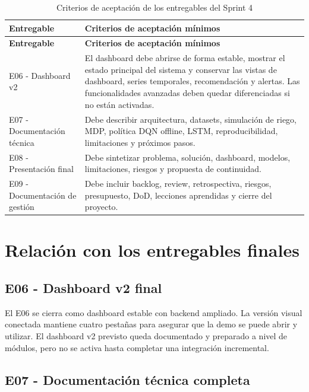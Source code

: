 \documentclass[11pt,a4paper]{article}
\begin{document}
\begin{longtable}{p{}p{}}
\caption{Criterios de aceptación de los entregables del Sprint 4}\\
\toprule
\textbf{Entregable} & \textbf{Criterios de aceptación mínimos} \\
\midrule
\endfirsthead
\toprule
\textbf{Entregable} & \textbf{Criterios de aceptación mínimos} \\
\midrule
\endhead
E06 - Dashboard v2 & El dashboard debe abrirse de forma estable, mostrar el estado principal del sistema y conservar las vistas de dashboard, series temporales, recomendación y alertas. Las funcionalidades avanzadas deben quedar diferenciadas si no están activadas. \\
E07 - Documentación técnica & Debe describir arquitectura, datasets, simulación de riego, MDP, política DQN offline, LSTM, reproducibilidad, limitaciones y próximos pasos. \\
E08 - Presentación final & Debe sintetizar problema, solución, dashboard, modelos, limitaciones, riesgos y propuesta de continuidad. \\
E09 - Documentación de gestión & Debe incluir backlog, review, retrospectiva, riesgos, presupuesto, DoD, lecciones aprendidas y cierre del proyecto. \\
\bottomrule
\end{longtable}

\newpage

\section{Relación con los entregables finales}

\subsection{E06 - Dashboard v2 final}

El E06 se cierra como dashboard estable con backend ampliado. La versión visual conectada mantiene cuatro pestañas para asegurar que la demo se puede abrir y utilizar. El dashboard v2 previsto queda documentado y preparado a nivel de módulos, pero no se activa hasta completar una integración incremental.

\subsection{E07 - Documentación técnica completa}
\end{document}

